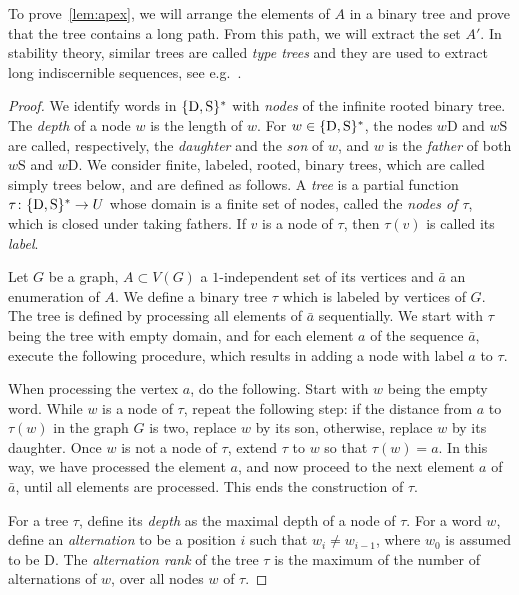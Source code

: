 To prove~\cref{lem:apex}, we will arrange the elements of $A$ in a binary tree
and prove that the tree contains a long path. From this path, we will 
extract the set $A'$. In stability theory, similar trees are called \emph{type trees} and they are used to extract long indiscernible sequences, see e.g.~\cite{malliaris2014regularity}. 

\begin{proof}
	\newcommand{\dau}{\mathrm{D}}
	\newcommand{\son}{\mathrm{S}}
	
	We identify words in $\set{\dau,\son}^*$ with \emph{nodes}
	of the infinite rooted binary tree. 
  The \emph{depth} of a node $w$ is the length of $w$.
  For $w\in \set{\dau,\son}^*$,
	 the nodes $w\dau$ and $w\son$ are called, respectively, the \emph{daughter} and the \emph{son} of $w$,
	and $w$ is the \emph{father} of both $w\son$ and $w\dau$.
	We consider
	 finite, labeled, rooted, binary trees, which are called simply trees below, and are defined as follows.
	 A \emph{tree} is a partial function $\tau\from \set{\dau,\son}^*\to U$ whose domain is a finite set of nodes, called the \emph{nodes of $\tau$}, which is closed under taking fathers. If $v$ is a node of $\tau$, then $\tau(v)$ is called its \emph{label}.
  
  Let $G$ be a graph, $A\subset V(G)$ a $1$-independent set of its vertices
  and $\bar a$ an enumeration of $A$.
We define  a binary tree $\tau$ which is 
  labeled by vertices of $G$. The tree is defined by processing all elements of $\bar a$ sequentially. We start with $\tau$ being the  tree with empty domain, and for each element $a$ of the sequence $\bar a$, execute the following procedure, which results in adding a node with label $a$ to $\tau$.
  
When processing the vertex $a$, do the following. Start with $w$ being the empty word. While $w$ is a node of $\tau$, repeat the following step: 
  if the distance from $a$ to $\tau(w)$ in the graph 
  $G$ is two, replace $w$ by its son, otherwise, replace $w$ by its daughter.
  Once $w$ is not a node of $\tau$, extend $\tau$ to $w$    so that  $\tau(w)=a$. In this way, we have processed the element $a$, and now
    proceed to the next element $a$ of $\bar a$, until all elements are processed. This ends the construction of $\tau$.
	
  
  
  
  \medskip
For a tree $\tau$, define its
\emph{depth} as 
the maximal depth of a node of $\tau$.
For a word $w$, define an \emph{alternation} to be 
a position $i$ such that $w_i\neq w_{i-1}$, where $w_0$ is assumed to be $\dau$.
 The \emph{alternation rank} of the tree $\tau$ is the maximum of the number of alternations of $w$, over all nodes $w$ of $\tau$.



\end{proof}
